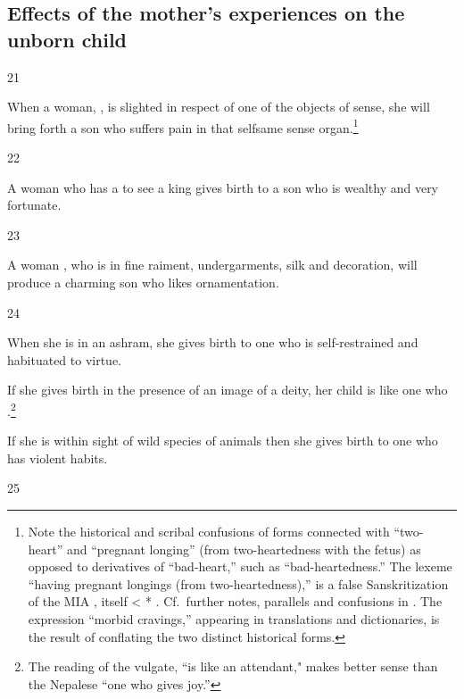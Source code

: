 \begin{translation}
\subsection{Effects of the mother's experiences on the unborn child}
  
\item[21]

When a woman, , is
slighted in respect of one of the objects of sense, she will bring
forth a son who suffers pain in that selfsame sense
organ.\footnote{Note the historical and scribal confusions of forms
    connected with  “two-heart” and  “pregnant
    longing” (from two-heartedness with the fetus) as opposed to
    derivatives of   “bad-heart,” such as 
    “bad-heartedness.”    The lexeme  “having pregnant
    longings (from two-heartedness),” is a  false Sanskritization of the
    MIA , itself < * \citep[46, 183
    n.\,2]{lued-1940}. Cf.\ further notes, parallels and confusions in
    \cite[\#6690]{CDIAL}.  The expression  “morbid cravings,” appearing in
    translations and dictionaries, is the result of conflating the two
    distinct historical forms.}
    
    \item [22]
   
A woman who has a  to see a king gives
birth to a son who is wealthy and very fortunate.
    
\item[23]

A woman , who is in 
fine raiment, undergarments, silk and decoration, 
will produce a charming son who likes ornamentation. 

\item[24]

When she is in an ashram, she gives birth to one who is self-restrained and 
habituated to virtue. 

If she gives birth in the presence of an image of a deity, her child
is like one who .\footnote{The reading of the vulgate,
     “is like an attendant," makes better sense than the
    Nepalese  “one who gives joy.”}

If she is within sight of wild species of animals then she gives birth
to one who has violent habits.


\item [25]


\end{translation}
